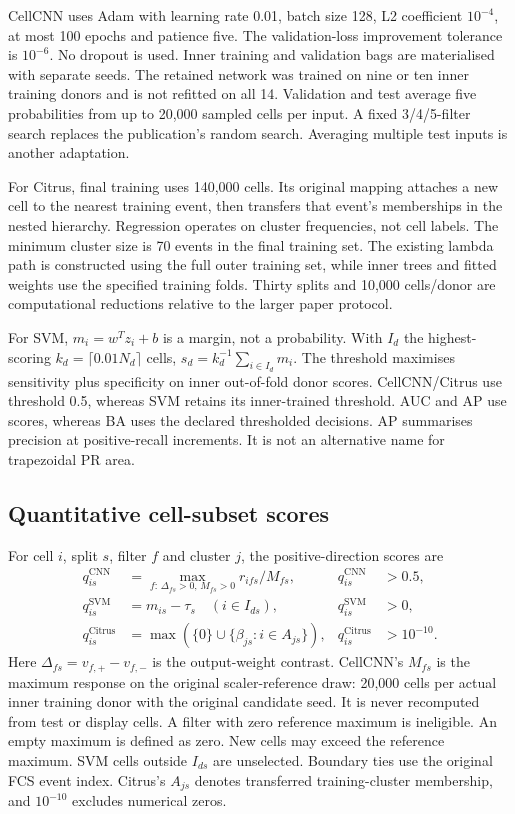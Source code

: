 \documentclass[11pt,a4paper]{article}
\begin{document}
CellCNN uses Adam with learning rate 0.01, batch size 128, L2 coefficient $10^{-4}$, at most 100 epochs and patience five. The validation-loss improvement tolerance is $10^{-6}$. No dropout is used. Inner training and validation bags are materialised with separate seeds. The retained network was trained on nine or ten inner training donors and is not refitted on all 14. Validation and test average five probabilities from up to 20,000 sampled cells per input. A fixed 3/4/5-filter search replaces the publication's random search. Averaging multiple test inputs is another adaptation.

For Citrus, final training uses 140,000 cells. Its original mapping attaches a new cell to the nearest training event, then transfers that event's memberships in the nested hierarchy. Regression operates on cluster frequencies, not cell labels. The minimum cluster size is 70 events in the final training set. The existing lambda path is constructed using the full outer training set, while inner trees and fitted weights use the specified training folds. Thirty splits and 10,000 cells/donor are computational reductions relative to the larger paper protocol.

For SVM, $m_i=w^Tz_i+b$ is a margin, not a probability. With $I_d$ the highest-scoring $k_d=\lceil0.01N_d\rceil$ cells, $s_d=k_d^{-1}\sum_{i\in I_d}m_i$. The threshold maximises sensitivity plus specificity on inner out-of-fold donor scores. CellCNN/Citrus use threshold 0.5, whereas SVM retains its inner-trained threshold. AUC and AP use scores, whereas BA uses the declared thresholded decisions. AP summarises precision at positive-recall increments. It is not an alternative name for trapezoidal PR area.

\subsection{Quantitative cell-subset scores}
For cell $i$, split $s$, filter $f$ and cluster $j$, the positive-direction scores are
\[
\begin{aligned}
q^{\mathrm{CNN}}_{is}&=\max_{f:\,\Delta_{fs}>0,\,M_{fs}>0}r_{ifs}/M_{fs}, &q^{\mathrm{CNN}}_{is}&>0.5,\\
q^{\mathrm{SVM}}_{is}&=m_{is}-\tau_s\quad(i\in I_{ds}), &q^{\mathrm{SVM}}_{is}&>0,\\
q^{\mathrm{Citrus}}_{is}&=\max(\{0\}\cup\{\beta_{js}:i\in A_{js}\}), &q^{\mathrm{Citrus}}_{is}&>10^{-10}.
\end{aligned}
\]
Here $\Delta_{fs}=v_{f,+}-v_{f,-}$ is the output-weight contrast. CellCNN's $M_{fs}$ is the maximum response on the original scaler-reference draw: 20,000 cells per actual inner training donor with the original candidate seed. It is never recomputed from test or display cells. A filter with zero reference maximum is ineligible. An empty maximum is defined as zero. New cells may exceed the reference maximum. SVM cells outside $I_{ds}$ are unselected. Boundary ties use the original FCS event index. Citrus's $A_{js}$ denotes transferred training-cluster membership, and $10^{-10}$ excludes numerical zeros.
\end{document}
